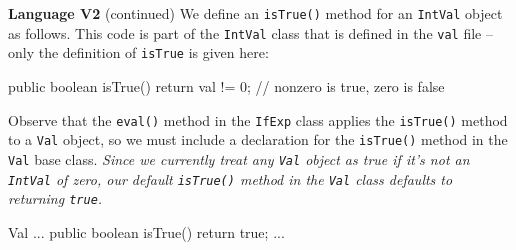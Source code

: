 \begin{minipage}[t]{\sw}
\slidenumber
\LARGE
{\bf Language V2} (continued)\exx
We define an \verb'isTrue()' method for an \verb'IntVal' object as follows.
This code is part of the \verb'IntVal' class that is defined
in the \verb'val' file --
only the definition of \verb'isTrue' is given here:
{\Large
\begin{qv}
public boolean isTrue() {
    return val != 0; // nonzero is true, zero is false
}
\end{qv}
}
Observe that the \verb'eval()' method in the \verb'IfExp' class applies
the \verb'isTrue()' method to a \verb'Val' object,
so we must include a declaration for the \verb'isTrue()' method
in the \verb'Val' base class.
{\em Since we currently treat any \verb'Val' object as true
if it's not an \verb'IntVal' of zero,
our default \verb'isTrue()' method in the \verb'Val' class defaults
to returning \verb'true'.}
{\Large
\begin{qv}
Val
...
    public boolean isTrue() {
        return true;
    }
...
\end{qv}
}
\end{minipage}
\clearpage
